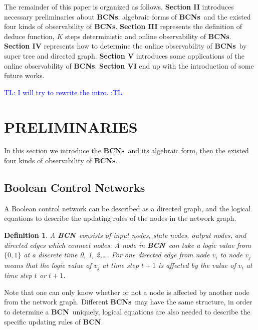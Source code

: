 \documentclass[letterpaper, 10 pt, conference]{ieeeconf}  %
\newtheorem{definition}{Definition}
\def \BCN {{\bf BCN}}
\def \BCNs {{\bf BCNs}}
\newcommand{\tl}[1]{\textcolor{blue} {TL: #1 :TL} }
\begin{document}
The remainder of this paper is organized as follows. {\bf Section II} introduces necessary preliminaries about {\bf BCNs}, algebraic forms of \BCNs\ and the existed four kinds of observability of {\bf BCNs}. {\bf Section III} represents the definition of deduce function, $K$ steps deterministic and online observability of {\bf BCNs}. {\bf Section IV} represents how to determine the online observability of \BCNs\ by super tree and directed graph. {\bf Section V} introduces some applications of the online observability of {\bf BCNs}. {\bf Section VI} end up  with the introduction of some future works.

\tl{I will try to rewrite the intro.}

\section{PRELIMINARIES}
In this section we introduce the \BCNs\ and its algebraic form, then the existed four kinds of observability of {\bf BCNs}.



\subsection{Boolean Control Networks}

A Boolean control network can be described as a directed graph, and the logical equations to describe the updating rules of the nodes in the network graph. 

\begin{definition}
A \BCN\ consists of input nodes, state nodes, output nodes, and directed edges which connect nodes. A node in \BCN\ can take a logic value from $\{0,1\}$ at a discrete time 0, 1, 2,\ldots. For one directed edge from node $v_i$ to node $v_j$ means that the logic value of $v_j$ at time step $t+1$ is affected by the value of $v_i$ at time step $t$ or $t+1$. 
\end{definition}


Note that one can only know whether or not a node is affected by another node from the network graph. Different \BCNs\ may have the same structure, in order to determine a \BCN\ uniquely, logical equations are also needed to describe the specific updating rules of {\bf BCN}.
\end{document}

